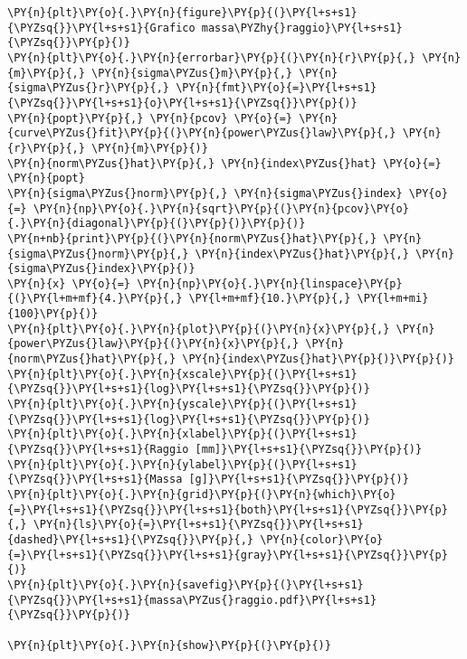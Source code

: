 \begin{Verbatim}[label=\makebox{\href{https://github.com/unipi-physics-labs/lab1-sheets/tree/main/snippy/densita.py}{https://github.com/.../densita.py}},commandchars=\\\{\}]
\PY{n}{plt}\PY{o}{.}\PY{n}{figure}\PY{p}{(}\PY{l+s+s1}{\PYZsq{}}\PY{l+s+s1}{Grafico massa\PYZhy{}raggio}\PY{l+s+s1}{\PYZsq{}}\PY{p}{)}
\PY{n}{plt}\PY{o}{.}\PY{n}{errorbar}\PY{p}{(}\PY{n}{r}\PY{p}{,} \PY{n}{m}\PY{p}{,} \PY{n}{sigma\PYZus{}m}\PY{p}{,} \PY{n}{sigma\PYZus{}r}\PY{p}{,} \PY{n}{fmt}\PY{o}{=}\PY{l+s+s1}{\PYZsq{}}\PY{l+s+s1}{o}\PY{l+s+s1}{\PYZsq{}}\PY{p}{)}
\PY{n}{popt}\PY{p}{,} \PY{n}{pcov} \PY{o}{=} \PY{n}{curve\PYZus{}fit}\PY{p}{(}\PY{n}{power\PYZus{}law}\PY{p}{,} \PY{n}{r}\PY{p}{,} \PY{n}{m}\PY{p}{)}
\PY{n}{norm\PYZus{}hat}\PY{p}{,} \PY{n}{index\PYZus{}hat} \PY{o}{=} \PY{n}{popt}
\PY{n}{sigma\PYZus{}norm}\PY{p}{,} \PY{n}{sigma\PYZus{}index} \PY{o}{=} \PY{n}{np}\PY{o}{.}\PY{n}{sqrt}\PY{p}{(}\PY{n}{pcov}\PY{o}{.}\PY{n}{diagonal}\PY{p}{(}\PY{p}{)}\PY{p}{)}
\PY{n+nb}{print}\PY{p}{(}\PY{n}{norm\PYZus{}hat}\PY{p}{,} \PY{n}{sigma\PYZus{}norm}\PY{p}{,} \PY{n}{index\PYZus{}hat}\PY{p}{,} \PY{n}{sigma\PYZus{}index}\PY{p}{)}
\PY{n}{x} \PY{o}{=} \PY{n}{np}\PY{o}{.}\PY{n}{linspace}\PY{p}{(}\PY{l+m+mf}{4.}\PY{p}{,} \PY{l+m+mf}{10.}\PY{p}{,} \PY{l+m+mi}{100}\PY{p}{)}
\PY{n}{plt}\PY{o}{.}\PY{n}{plot}\PY{p}{(}\PY{n}{x}\PY{p}{,} \PY{n}{power\PYZus{}law}\PY{p}{(}\PY{n}{x}\PY{p}{,} \PY{n}{norm\PYZus{}hat}\PY{p}{,} \PY{n}{index\PYZus{}hat}\PY{p}{)}\PY{p}{)}
\PY{n}{plt}\PY{o}{.}\PY{n}{xscale}\PY{p}{(}\PY{l+s+s1}{\PYZsq{}}\PY{l+s+s1}{log}\PY{l+s+s1}{\PYZsq{}}\PY{p}{)}
\PY{n}{plt}\PY{o}{.}\PY{n}{yscale}\PY{p}{(}\PY{l+s+s1}{\PYZsq{}}\PY{l+s+s1}{log}\PY{l+s+s1}{\PYZsq{}}\PY{p}{)}
\PY{n}{plt}\PY{o}{.}\PY{n}{xlabel}\PY{p}{(}\PY{l+s+s1}{\PYZsq{}}\PY{l+s+s1}{Raggio [mm]}\PY{l+s+s1}{\PYZsq{}}\PY{p}{)}
\PY{n}{plt}\PY{o}{.}\PY{n}{ylabel}\PY{p}{(}\PY{l+s+s1}{\PYZsq{}}\PY{l+s+s1}{Massa [g]}\PY{l+s+s1}{\PYZsq{}}\PY{p}{)}
\PY{n}{plt}\PY{o}{.}\PY{n}{grid}\PY{p}{(}\PY{n}{which}\PY{o}{=}\PY{l+s+s1}{\PYZsq{}}\PY{l+s+s1}{both}\PY{l+s+s1}{\PYZsq{}}\PY{p}{,} \PY{n}{ls}\PY{o}{=}\PY{l+s+s1}{\PYZsq{}}\PY{l+s+s1}{dashed}\PY{l+s+s1}{\PYZsq{}}\PY{p}{,} \PY{n}{color}\PY{o}{=}\PY{l+s+s1}{\PYZsq{}}\PY{l+s+s1}{gray}\PY{l+s+s1}{\PYZsq{}}\PY{p}{)}
\PY{n}{plt}\PY{o}{.}\PY{n}{savefig}\PY{p}{(}\PY{l+s+s1}{\PYZsq{}}\PY{l+s+s1}{massa\PYZus{}raggio.pdf}\PY{l+s+s1}{\PYZsq{}}\PY{p}{)}

\PY{n}{plt}\PY{o}{.}\PY{n}{show}\PY{p}{(}\PY{p}{)}
\end{Verbatim}
